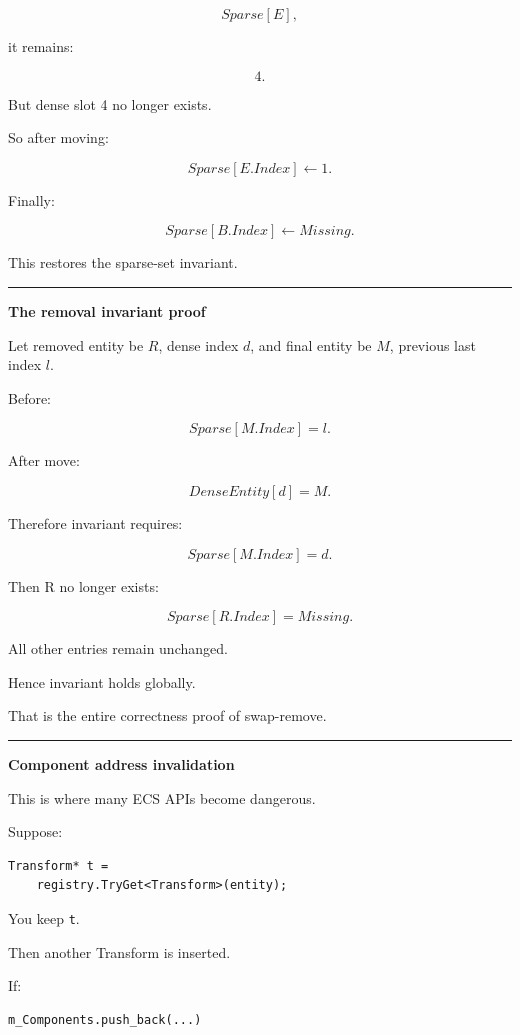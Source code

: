 \[
Sparse[E],
\]

it remains:

\[
4.
\]

But dense slot 4 no longer exists.

So after moving:

\[
\boxed{
Sparse[E.Index]\leftarrow1.
}
\]

Finally:

\[
Sparse[B.Index]\leftarrow Missing.
\]

This restores the sparse-set invariant.

\begin{center}\rule{0.5\linewidth}{0.5pt}\end{center}

\textbf{The removal invariant proof}

Let removed entity be \(R\), dense index \(d\), and final entity be \(M\), previous last index \(l\).

Before:

\[
Sparse[M.Index]=l.
\]

After move:

\[
DenseEntity[d]=M.
\]

Therefore invariant requires:

\[
Sparse[M.Index]=d.
\]

Then R no longer exists:

\[
Sparse[R.Index]=Missing.
\]

All other entries remain unchanged.

Hence invariant holds globally.

That is the entire correctness proof of swap-remove.

\begin{center}\rule{0.5\linewidth}{0.5pt}\end{center}

\textbf{Component address invalidation}

This is where many ECS APIs become dangerous.

Suppose:

\begin{verbatim}
Transform* t =
    registry.TryGet<Transform>(entity);
\end{verbatim}

You keep \texttt{t}.

Then another Transform is inserted.

If:

\begin{verbatim}
m_Components.push_back(...)
\end{verbatim}


